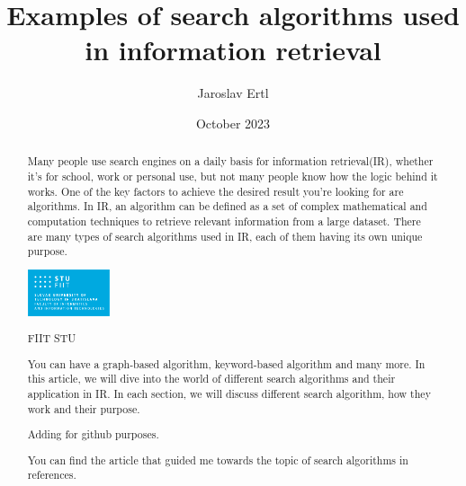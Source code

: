 \documentclass[10pt,twocolumn,twoside,slovak,a4paper]{article}
\title{\textbf{Examples of search algorithms used in information retrieval}}
\author{Jaroslav Ertl}
\date{October 2023}
\begin{document}
\maketitle
 
\begin{abstract}
    Many people use search engines on a daily basis for information retrieval(IR), whether it's for school, work or personal use, but not many people know how the logic behind it works. One of the key factors to achieve the desired result you're looking for are algorithms. In IR, an algorithm can be defined as a set of complex mathematical and computation techniques to retrieve relevant information from a large dataset. There are many types of search algorithms used in IR, each of them having its own unique purpose. 

\begin{floatingfigure}[l]{0.3\textwidth}
    \centering
  \includegraphics[width=0.2\textwidth]{StuFiit.png}
  \caption{FIIT STU}
\end{floatingfigure}
  You can have a graph-based algorithm, keyword-based algorithm and many more. In this article, we will dive into the world of different search algorithms and their application in IR. In each section, we will discuss different search algorithm, how they work and their purpose.
    
    Adding for github purposes.
    
You can find the article that guided me towards the topic of search algorithms in references.\cite{10210566}
\end{abstract}


 
\cite{Chonyy}
\end{document}
